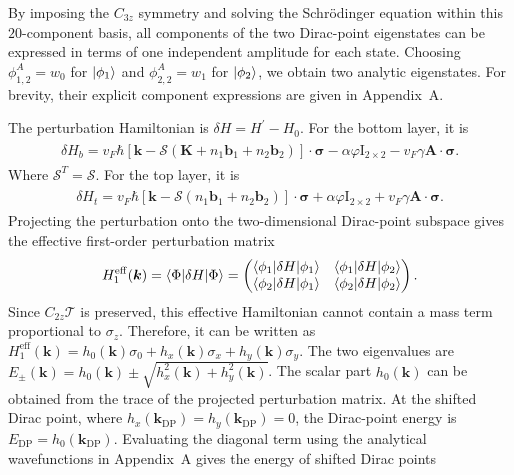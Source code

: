\documentclass[10pt, oneside]{article}
\newcommand{\vph}{\varphi}
\newcommand{\pr}{\prime}
\newcommand{\mr}[1]{\mathrm{#1}}
\newcommand{\p}[1]{\left(#1\right)}
\newcommand{\bb}[1]{\left[#1\right]}
\begin{document}
By imposing the \(C_{3z}\) symmetry and solving the Schr\"odinger equation within this \(20\)-component basis, all components of the two Dirac-point eigenstates can be expressed in terms of one independent amplitude for each state. Choosing \(\phi_{1,2}^{A}=w_0\) for \(\ket{\phi_1}\) and \(\phi_{2,2}^{A}=w_1\) for \(\ket{\phi_2}\), we obtain two analytic eigenstates. For brevity, their explicit component expressions are given in Appendix~A.

The perturbation Hamiltonian is \(\delta H = H^{\pr} - H_{0}\). For the bottom layer, it is
\begin{align}
	\begin{split}
		\delta H_{b} = v_F \hbar \bb{ \bm{k} - \mathcal{S} \p{\bm{K} + n_1 \bm{b}_{1} + n_2 \bm{b}_{2}}} \cdot \bm{\sigma} - \alpha \vph \mr{I}_{2 \times 2} - v_F \gamma \bm{A} \cdot \bm{\sigma}.
	\end{split}
\end{align}
Where \(\mathcal{S}^{T} = \mathcal{S}\). For the top layer, it is
\begin{align}
	\begin{split}
		\delta H_{t}  = v_F \hbar \bb{\bm{k} - \mathcal{S} \p{n_1 \bm{b}_{1} + n_2 \bm{b}_{2}}}  \cdot \bm{\sigma} + \alpha\vph \mr{I}_{2\times2} + v_F\gamma\bm{A}\cdot\bm{\sigma}.		
	\end{split}
\end{align}
Projecting the perturbation onto the two-dimensional Dirac-point subspace gives the effective first-order perturbation matrix
\begin{align}
	H_{1}^{\mathrm{eff}}(\bm{k}) = \braket{\Phi|\delta H|\Phi}  = \begin{pmatrix}
		\braket{\phi_{1} | \delta H | \phi_{1}} & \braket{\phi_{1} | \delta H | \phi_{2}} \\
		\braket{\phi_{2} | \delta H | \phi_{1}} & \braket{\phi_{2} | \delta H | \phi_{2}}
	\end{pmatrix}.
\end{align}
Since \(C_{2z}\mathcal{T}\) is preserved, this effective Hamiltonian cannot contain a mass term proportional to \(\sigma_z\). Therefore, it can be written as \(H_{1}^{\mathrm{eff}}(\bm{k}) = h_0(\bm{k})\sigma_0 + h_x(\bm{k})\sigma_x + h_y(\bm{k})\sigma_y \). The two eigenvalues are \(E_{\pm}(\bm{k}) = h_0(\bm{k}) \pm \sqrt{ h_x^2(\bm{k}) + h_y^2(\bm{k})}\). The scalar part \(h_0(\bm{k})\) can be obtained from the trace of the projected perturbation matrix. At the shifted Dirac point, where \(h_x(\bm{k}_{\mr{DP}})=h_y(\bm{k}_{\mr{DP}})=0\), the Dirac-point energy is \(E_{\mr{DP}} = h_0(\bm{k}_{\mr{DP}})\). Evaluating the diagonal term using the analytical wavefunctions in Appendix~A gives the energy of shifted Dirac points
\end{document}
